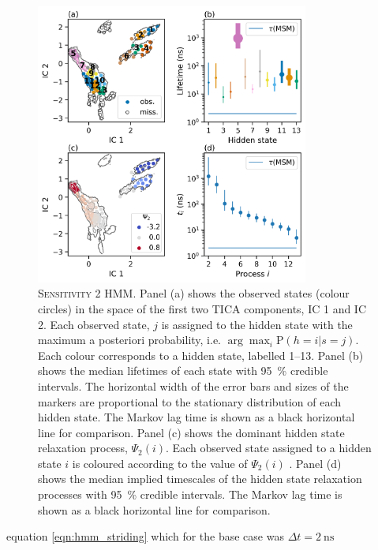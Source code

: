 \begin{figure}
    \centering
    \caption[Sensitivity 2 HMM]{\textsc{Sensitivity 2 HMM}.  Panel (a) shows the observed states (colour circles) in the space of the first two TICA components, IC 1 and IC 2. Each observed state, $j$ is assigned to the hidden state with the maximum a posteriori probability, i.e.  $\arg \max_{i} \mathrm{P}(h=i|s=j)$. Each colour corresponds to a hidden state, labelled \numrange{1}{13}. Panel (b) shows the median lifetimes of each state with \SI{95}{\percent} credible intervals. The horizontal width of the error bars and sizes of the markers are proportional to the stationary distribution of each hidden state. The Markov lag time is shown as a black horizontal line for comparison. Panel (c) shows the dominant hidden state relaxation process, $\Psi_{2}(i)$. Each observed state assigned to a hidden state $i$ is coloured according to the value of $\Psi_{2}(i)$ . Panel (d) shows the median implied timescales of the hidden state relaxation processes with \SI{95}{\percent} credible intervals. The Markov lag time is shown as a black horizontal line for comparison. }
    \label{fig:sensitivity_2_bhmm}
    \includegraphics[width=0.8\textwidth]{chapters/aadh/figures/sensitivity_2_hmm.png}
\end{figure}

equation \ref{eqn:hmm_striding} which for the base case was $\Delta t = \SI{2}{\nano\second}$

